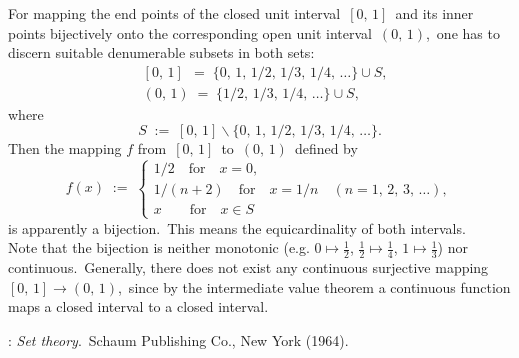 \documentclass[12pt]{article}
\theoremstyle{definition}
\begin{document}
For mapping the end points of the closed unit interval\, $[0,\,1]$\, and its inner points bijectively onto the corresponding open unit interval\, $(0,\,1)$,\, one has to discern suitable denumerable subsets in both sets:
\begin{align*}
& [0,\,1]\, \;=\; \{0,\,1,\,1/2,\,1/3,\,1/4,\,\ldots\}\cup S,\\
&(0,\,1) \;=\; \{1/2,\,1/3,\,1/4,\,\ldots\}\cup S,
\end{align*}
where
$$S \;:=\; [0,\,1]\smallsetminus\{0,\,1,\,1/2,\,1/3,\,1/4,\,\ldots\}.$$
Then the mapping $f$ from\, $[0,\,1]$\, to\, $(0,\,1)$\, defined by
$$f(x) \;:=\;
\begin{cases}
 1/2 \quad \mbox{for}\quad x = 0,\\
 1/(n\!+\!2) \quad \mbox{for} \quad x = 1/n \quad (n = 1,\,2,\,3,\,\ldots),\\
 x \qquad \mbox{for} \quad x \in S
\end{cases}$$
is apparently a bijection.\, This means the equicardinality of both intervals.\\

Note that the bijection is neither monotonic (e.g. $0 \mapsto \frac{1}{2}$,\; $\frac{1}{2}\mapsto \frac{1}{4}$,\; 
$1 \mapsto \frac{1}{3}$) nor continuous.\, Generally, there does not exist any continuous surjective mapping\, 
$[0,\,1] \to (0,\,1)$,\, since by the intermediate value theorem a continuous function maps a closed interval to a closed interval.

\begin{thebibliography}{8}
: {\em Set theory}.\, Schaum Publishing Co., New York (1964).
\end{thebibliography}

\end{document}
